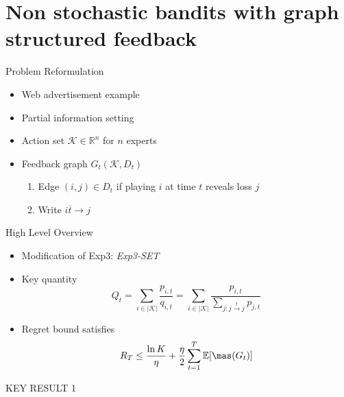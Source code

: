 \documentclass{beamer}
\begin{document}
\section{Non stochastic bandits with graph structured feedback}
\begin{frame}{Problem Reformulation}
  \begin{itemize}
    \item Web advertisement example

    \item Partial information setting

    \item Action set $\mathcal{K}\in \mathbb{R}^n$ for $n$ experts
    \item Feedback graph $G_t(\mathcal{K}, D_t)$ 
    \begin{enumerate}
      \item Edge $(i,j)\in D_t$ if playing $i$ at time $t$ reveals loss $j$
      \item Write $i\overline{t}{\to}j$
    \end{enumerate}
  \end{itemize}
\end{frame}

\begin{frame}{High Level Overview}
  \begin{itemize}
    \item Modification of Exp3: \textit{Exp3-SET}
    
    \item Key quantity $$Q_t=\sum_{i\in |\mathcal{K}|}\frac{p_{i,t}}{q_{i,t}} = \sum_{i\in |\mathcal{K}|}\frac{p_{i,t}}{\sum_{j:j\overset{t}{\to}j} p_{j,t}}$$

    \item Regret bound satisfies $$R_T\leq \frac{\ln K}{\eta} +\frac{\eta}{2}\sum_{t=1}^T\mathbb{E}[\mas(G_t)]$$
  \end{itemize}
\end{frame} 

\begin{frame}{KEY RESULT 1}
\end{frame}
\end{document}
